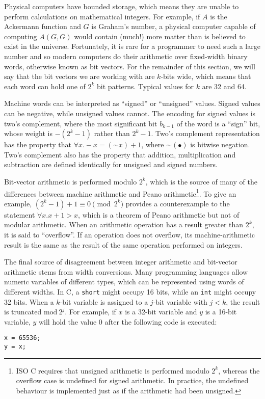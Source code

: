 \documentclass[preprint]{sigplanconf}
\theoremstyle{definition}
\begin{document}
Physical computers have bounded storage, which means they are unable to
perform calculations on mathematical integers.  For example, if $A$ is the
Ackermann function and $G$ is Graham's number, a physical computer capable
of computing $A(G, G)$ would contain (much!) more matter than is believed to
exist in the universe.  Fortunately, it is rare for a programmer to need
such a large number and so modern computers do their arithmetic over
fixed-width binary words, otherwise known as bit vectors.  For the remainder
of this section, we will say that the bit vectors we are working with are
$k$-bits wide, which means that each word can hold one of $2^k$ bit
patterns.  Typical values for $k$ are 32 and 64.

Machine words can be interpreted as ``signed'' or ``unsigned'' values. 
Signed values can be negative, while unsigned values cannot.  The encoding
for signed values is two's complement, where the most significant bit
$b_{k-1}$ of the word is a ``sign'' bit, whose weight is $-(2^k - 1)$ rather
than $2^k - 1$.  Two's complement representation has the property that
$\forall x .  -x = (\mathord{\sim} x) + 1$, where $\mathord{\sim}(\bullet)$
is bitwise negation.  Two's complement also has the property that addition,
multiplication and subtraction are defined identically for unsigned and
signed numbers.

Bit-vector arithmetic is performed modulo $2^k$, which is the source of many
of the differences between machine arithmetic and Peano
arithmetic\footnote{ISO C requires that unsigned arithmetic is performed
modulo $2^k$, whereas the overflow case is undefined for signed arithmetic. 
In practice, the undefined behaviour is implemented just as if the
arithmetic had been unsigned.}.  To give an example, $(2^k - 1) + 1 \equiv 0
\pmod {2^k}$ provides a counterexample to the statement $\forall x. 
x + 1 > x$, which is a theorem of Peano arithmetic but not of modular
arithmetic.  When an arithmetic operation has a result greater than $2^k$,
it is said to ``overflow''.  If an operation does not overflow, its
machine-arithmetic result is the same as the result of the same operation
performed on integers.

The final source of disagreement between integer arithmetic and bit-vector
arithmetic stems from width conversions.  Many programming languages allow
numeric variables of different types, which can be represented using words
of different widths.  In C, a \texttt{short} might occupy 16 bits, while an
\texttt{int} might occupy 32 bits.  When a $k$-bit variable is assigned to a
$j$-bit variable with $j < k$, the result is truncated $\mathrm{mod}~2^j$.  For
example, if $x$ is a 32-bit variable and $y$ is a 16-bit variable, $y$ will
hold the value $0$ after the following code is executed:
%
\begin{lstlisting}
x = 65536;
y = x;
\end{lstlisting}
\end{document}
